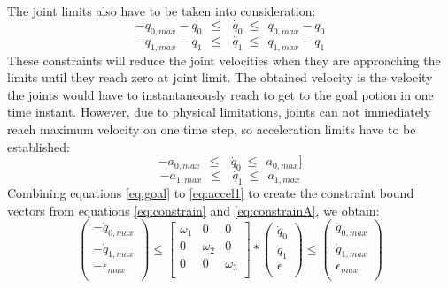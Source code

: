 The joint limits also have to be taken into consideration:
\begin{equation}
-q_{0,max} - q_{0}\ \ \leq\ \ \dot{\ q_{0}}\ \leq\ \ q_{0,max} - q_{0}
\end{equation}
\begin{equation}
-q_{1,max} - q_{1}\ \ \leq\ \ \dot{\ q_{1}}\ \leq\ \ q_{1,max} - q_{1}
\end{equation}
These constraints will reduce the joint velocities when they are approaching the limits until they reach zero at joint limit. The obtained velocity is the velocity the joints would have to instantaneously reach to get to the goal potion in one time instant. However, due to physical limitations, joints can not immediately reach maximum velocity on one time step, so acceleration limits have to be established:
\begin{equation}
-a_{0,max}\ \ \leq\ \ \dot{\ q_{0}}\ \leq\ \ a_{0,max}
\label{eq:accel0}]
\end{equation}
\begin{equation}
-a_{1,max}\ \ \leq\ \ \dot{\ q_{1}}\ \leq\ \ a_{1,max}
\label{eq:accel1}
\end{equation}
Combining equations \ref{eq:goal} to \ref{eq:accel1} to create the constraint bound vectors from equations \ref{eq:constrain} and \ref{eq:constrainA}, we obtain:
\begin{equation}
\left( \begin{array}{c}
-\dot{q}_{0,max} \\
-\dot{q}_{1,max} \\
-\epsilon_{max} \\
\end{array}
\right)	\leq 
\left[ \begin{array}{cccc}
\omega_{1} & 0 & 0 \\
0 & \omega_{2} & 0 \\
0 & 0 & \omega_{3} \\
\end{array}
\right] *
\left( \begin{array}{c}
\dot{q}_{0} \\
\dot{q}_{1} \\
\epsilon \\
\end{array}
\right) 
\leq \left( \begin{array}{c}
\dot{q}_{0,max} \\
\dot{q}_{1,max} \\
\epsilon_{max} \\
\end{array}
\right)
\label{eq:state_constr}
\end{equation}

